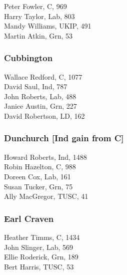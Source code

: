 \documentclass[a4paper,openany,10pt]{book}
\begin{document}


Peter Fowler, C, 969\\
Harry Taylor, Lab, 803\\
Mandy Williams, UKIP, 491\\
Martin Atkin, Grn, 53\\


\subsubsection*{Cubbington}



Wallace Redford, C, 1077\\
David Saul, Ind, 787\\
John Roberts, Lab, 488\\
Janice Austin, Grn, 227\\
David Robertson, LD, 162\\


\subsubsection*{Dunchurch \hspace*{\fill}\nolinebreak[1]%
\enspace\hspace*{\fill}
[Ind gain from C]}



Howard Roberts, Ind, 1488\\
Robin Hazelton, C, 988\\
Doreen Cox, Lab, 161\\
Susan Tucker, Grn, 75\\
Ally MacGregor, TUSC, 41\\


\subsubsection*{Earl Craven}



Heather Timms, C, 1434\\
John Slinger, Lab, 569\\
Ellie Roderick, Grn, 189\\
Bert Harris, TUSC, 53\\
\end{document}
